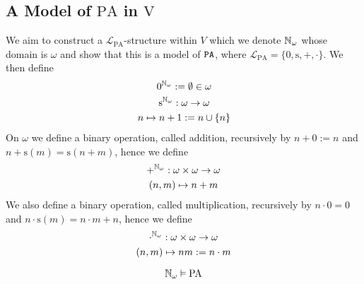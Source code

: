 \subsection{A Model of $\mathrm{PA}$ in $\mathrm{V}$}
We aim to construct a $\mathcal{L}_{\mathrm{PA}}$-structure within $V$ which we denote $\mathbb{N}_{\omega}$ whose domain is $\omega$ and show that this is a model of $\verb|PA|$, where $\mathcal{L}_{\mathrm{PA}}=\{0,\mathrm{s},+,\cdot\}$. We then define 
\begin{gather*}
    0^{\mathbb{N}_\omega} := \emptyset\in \omega\\
    \mathrm{s}^{\mathbb{N}_\omega} : \omega \rightarrow \omega\\
    n \mapsto n+1:= n\cup\{n\}\\
\end{gather*}
On $\omega$ we define a binary operation, called addition, recursively by $n+0:= n$ and $n+\mathrm{s}(m)=\mathrm{s}(n+m)$, hence we define 
\begin{gather*}
    +^{\mathbb{N}_\omega}: \omega \times \omega \rightarrow \omega\\
    (n,m) \mapsto n+m
\end{gather*}
We also define a binary operation, called multiplication, recursively by $n\cdot 0 = 0$ and $n\cdot \mathrm{s}(m)= n\cdot m+n$, hence we define 
\begin{gather*}
    \cdot^{\mathbb{N}_\omega}: \omega\times \omega \rightarrow \omega\\
    (n,m)\mapsto nm := n\cdot m
\end{gather*}
\begin{theorem}
    $$\mathbb{N}_\omega \vDash \mathrm{PA}$$
\end{theorem}
